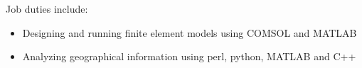 \normalsize
Job duties include:
\small
\begin{itemize}
    \item Designing and running finite element models using COMSOL and MATLAB
    \item Analyzing geographical information using perl, python, MATLAB and C++
\end{itemize}
\normalsize
\medskip
